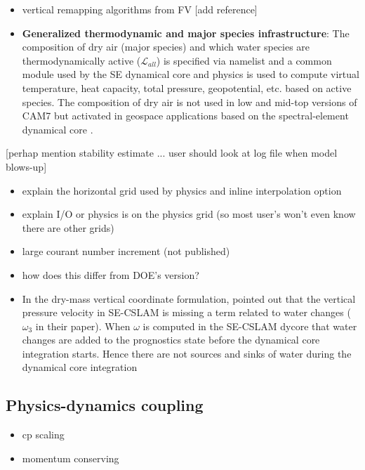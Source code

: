 \documentclass[draft]{agujournal2019}
\begin{document}
\begin{itemize}
\item vertical remapping algorithms from FV [add reference]
\item {\bf{Generalized thermodynamic and major species infrastructure}}: The composition of dry air (major species) and which water species are thermodynamically active ($\mathcal{L}_{all}$) is specified via namelist and a common module used by the SE dynamical core and physics is used to compute virtual temperature, heat capacity, total pressure, geopotential, etc. based on active species. The composition of dry air is not used in low and mid-top versions of CAM7 but activated in geospace applications based on the spectral-element dynamical core \cite[see section 2 of former paper for description of major species formulation]{WACCMx-SE,WACCMx-SE2}. 
\end{itemize}


[perhap mention stability estimate ... user should look at log file when model blows-up]


 
 \begin{itemize}
 \item explain the horizontal grid used by physics and inline interpolation option
    \item explain I/O or physics is on the physics grid (so most user's won't even know there are other grids)
    \item large courant number increment (not published)
    \item how does this differ from DOE's version? \cite{DOEphysgrid}
    \item In the dry-mass vertical coordinate formulation,  \citeauthor{PetAl2020QJRMS} pointed out that the vertical pressure velocity in SE-CSLAM is missing a term related to water changes ($\omega_3$ in their paper). When $\omega$ is computed in the SE-CSLAM dycore that water changes are added to the prognostics state before the dynamical core integration starts. Hence there are not sources and sinks of water during the dynamical core integration
\end{itemize}


\subsection{Physics-dynamics coupling}
\begin{itemize}
    \item cp scaling
    \item momentum conserving
\end{itemize}
\end{document}
